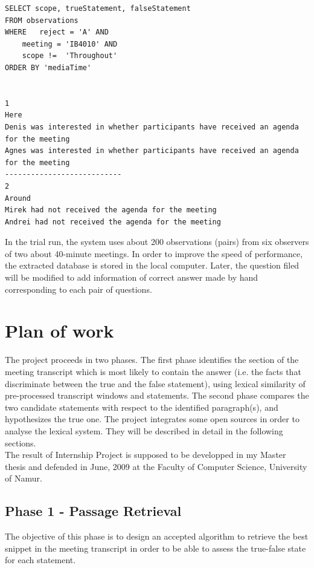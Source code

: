 \documentclass[12pt, a4paper]{report}
\begin{document}
\small
\begin{verbatim}  
SELECT scope, trueStatement, falseStatement 
FROM observations 
WHERE	reject = 'A' AND 
	meeting = 'IB4010' AND 
	scope !=  'Throughout' 
ORDER BY 'mediaTime'


1
Here
Denis was interested in whether participants have received an agenda for the meeting
Agnes was interested in whether participants have received an agenda for the meeting
---------------------------
2
Around
Mirek had not received the agenda for the meeting
Andrei had not received the agenda for the meeting
\end{verbatim}
\normalsize

In the trial run, the system uses about 200 observations (pairs) from six observers of two about 40-minute meetings. In order to improve the speed of performance, the extracted database is stored in the local computer. Later, the question filed will be modified to add information of correct answer made by hand corresponding to each pair of questions. 



\section{Plan of work}


The project proceeds in two phases. The first phase identifies the section of the meeting transcript which is most likely to contain the answer (i.e. the facts that discriminate between the true and the false statement), using lexical similarity of pre-processed transcript windows and statements. The second phase compares the two candidate statements with respect to the identified paragraph(s), and hypothesizes the true one. The project integrates some open sources in order to analyse the lexical system. They will be described in detail in the following sections.\\

 The result of Internship Project is supposed to be developped in my Master thesis and defended in June, 2009 at the Faculty of Computer Science, University of Namur. 
\subsection{Phase 1 - Passage Retrieval}

The objective of this phase is to design an accepted algorithm to retrieve the best snippet in the meeting transcript in order to be able to assess the true-false state for each statement.
\end{document}
